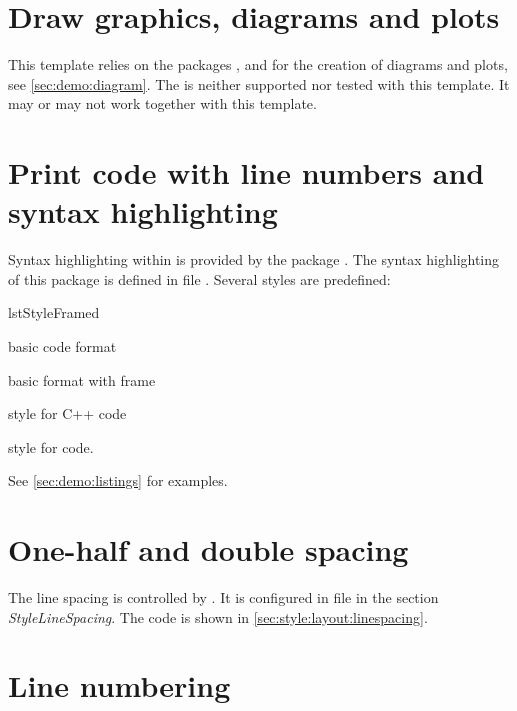 \section{Draw graphics, diagrams and plots}
\label{sec:doc:faq:pgf}

This template relies on the packages ,  and  for the creation of diagrams and plots, see \cref{sec:demo:diagram}. The  is neither supported nor tested with this template. It may or may not work together with this template.

\section{Print code with line numbers and syntax highlighting}
\label{sec:doc:faq:listings}

Syntax highlighting within \latex is provided by the package . The syntax highlighting of this package is defined in file .
Several styles are predefined:
\begin{labeling}{\ttfamily lstStyleFramed}
\item[\ttfamily lstStyleBase] basic code format
\item[\ttfamily lstStyleFramed] basic format with frame
\item[\ttfamily lstStyleCpp] style for C++ code
\item[\ttfamily lstStyleLaTeX] style for \latex code.
\end{labeling}
See \cref{sec:demo:listings} for examples.

\section{One-half and double spacing}
\label{sec:doc:faq:spacing}

The line spacing is controlled by . It is configured in file  in the section \emph{StyleLineSpacing}. The code is shown in \cref{sec:style:layout:linespacing}.

\section{Line numbering}
\label{sec:doc:faq:linenumbering}

